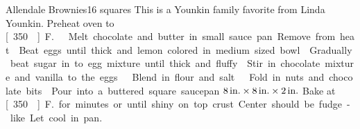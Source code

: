 \begin{recipe}{Allendale Brownies}{16 squares}{}
\freeform This is a Younkin family favorite from Linda Younkin.
\newstep Preheat oven to \unit[350\0]{F.}
Melt chocolate and butter in small sauce pan.  Remove from heat.
Beat eggs until thick and lemon colored in medium sized bowl.
Gradually beat sugar in to egg mixture until thick and fluffy.
Stir in chocolate mixture and vanilla to the eggs.
Blend in flour and salt.
Fold in nuts and chocolate bits.
\newstep Pour into a buttered square saucepan $\unit[8]{in.}\times \unit[8]{in.}\times\unit[2]{in.}$
\newstep Bake at \unit[350\0]{F.} for \unit[30]{minutes} or until shiny on top crust.  Center should be fudge-like.  Let cool in pan.
\end{recipe}
